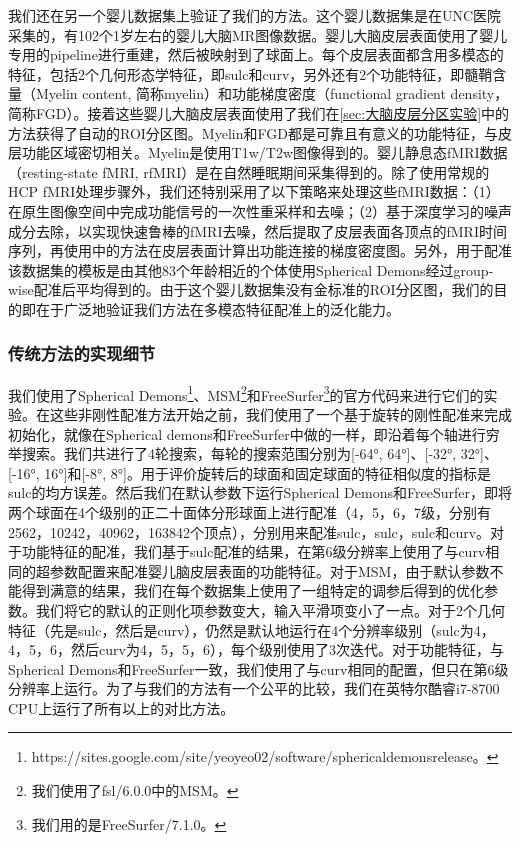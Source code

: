 我们还在另一个婴儿数据集上验证了我们的方法。这个婴儿数据集是在UNC医院采集的，有102个1岁左右的婴儿大脑MR图像数据。婴儿大脑皮层表面使用了婴儿专用的pipeline\cite{li2015construction,li2014measuring,wang2018volume}进行重建，然后被映射到了球面上。每个皮层表面都含用多模态的特征，包括2个几何形态学特征，即sulc和curv，另外还有2个功能特征，即髓鞘含量（Myelin content, 简称myelin）和功能梯度密度（functional gradient density，简称FGD）。接着这些婴儿大脑皮层表面使用了我们在\ref{sec:大脑皮层分区实验}中的方法获得了自动的ROI分区图。Myelin和FGD都是可靠且有意义的功能特征，与皮层功能区域密切相关\cite{glasser2016multi}。Myelin是使用T1w/T2w图像得到的。婴儿静息态fMRI数据（resting-state fMRI, rfMRI）是在自然睡眠期间采集得到的。除了使用常规的HCP fMRI处理步骤\cite{glasser2013minimal}外，我们还特别采用了以下策略\cite{hu2020disentangled}来处理这些fMRI数据：（1）在原生图像空间中完成功能信号的一次性重采样和去噪；（2）基于深度学习的噪声成分去除，以实现快速鲁棒的fMRI去噪，然后提取了皮层表面各顶点的fMRI时间序列，再使用\cite{huang2020construction,gordon2016generation}中的方法在皮层表面计算出功能连接的梯度密度图。另外，用于配准该数据集的模板是由其他83个年龄相近的个体使用Spherical Demons\cite{yeo2009spherical}经过group-wise配准后平均得到的。由于这个婴儿数据集没有金标准的ROI分区图，我们的目的即在于广泛地验证我们方法在多模态特征配准上的泛化能力。

\subsubsection{传统方法的实现细节}\label{sec:配准的基准方法}
我们使用了Spherical Demons\footnote{https://sites.google.com/site/yeoyeo02/software/sphericaldemonsrelease。}、MSM\footnote{我们使用了fsl/6.0.0中的MSM。}和FreeSurfer\footnote{我们用的是FreeSurfer/7.1.0。}的官方代码来进行它们的实验。在这些非刚性配准方法开始之前，我们使用了一个基于旋转的刚性配准来完成初始化，就像在Spherical demons\cite{yeo2009spherical}和FreeSurfer\cite{fischl2012freesurfer}中做的一样，即沿着每个轴进行穷举搜索。我们共进行了4轮搜索，每轮的搜索范围分别为[-64°, 64°]、[-32°, 32°]、[-16°, 16°]和[-8°, 8°]。用于评价旋转后的球面和固定球面的特征相似度的指标是sulc的均方误差。然后我们在默认参数下运行Spherical Demons和FreeSurfer，即将两个球面在4个级别的正二十面体分形球面上进行配准（4，5，6，7级，分别有2562，10242，40962，163842个顶点），分别用来配准sulc，sulc，sulc和curv。对于功能特征的配准，我们基于sulc配准的结果，在第6级分辨率上使用了与curv相同的超参数配置来配准婴儿脑皮层表面的功能特征。对于MSM，由于默认参数不能得到满意的结果，我们在每个数据集上使用了一组特定的调参后得到的优化参数。我们将它的默认的正则化项参数变大，输入平滑项变小了一点。对于2个几何特征（先是sulc，然后是curv），仍然是默认地运行在4个分辨率级别（sulc为4，4，5，6，然后curv为4，5，5，6），每个级别使用了3次迭代。对于功能特征，与Spherical Demons和FreeSurfer一致，我们使用了与curv相同的配置，但只在第6级分辨率上运行。为了与我们的方法有一个公平的比较，我们在英特尔酷睿i7-8700 CPU上运行了所有以上的对比方法。

